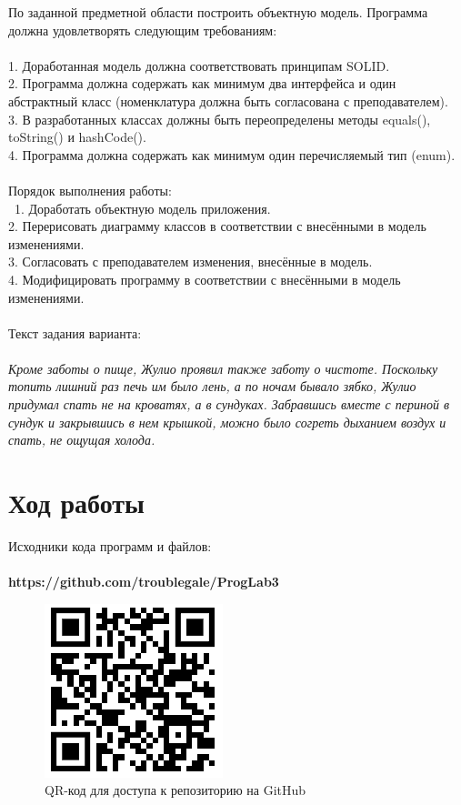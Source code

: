 \documentclass[12pt]{article}
\begin{document}
По заданной предметной области построить объектную модель. Программа должна удовлетворять следующим требованиям:\\
\\
1. Доработанная модель должна соответствовать принципам SOLID.\\
2. Программа должна содержать как минимум два интерфейса и один абстрактный класс (номенклатура должна быть согласована с преподавателем).\\
3. В разработанных классах должны быть переопределены методы equals(), toString() и hashCode().\\
4. Программа должна содержать как минимум один перечисляемый тип (enum).\\
\\
Порядок выполнения работы:\\
\
1. Доработать объектную модель приложения.\\
2. Перерисовать диаграмму классов в соответствии с внесёнными в модель изменениями.\\
3. Согласовать с преподавателем изменения, внесённые в модель.\\
4. Модифицировать программу в соответствии с внесёнными в модель изменениями.\\
\\
Текст задания варианта:\\
\\
\textit{Кроме заботы о пище, Жулио проявил также заботу о чистоте. Поскольку топить лишний раз печь им было лень, а по ночам бывало зябко, Жулио придумал спать не на кроватях, а в сундуках. Забравшись вместе с периной в сундук и закрывшись в нем крышкой, можно было согреть дыханием воздух и спать, не ощущая холода.}

\newpage

\section{Ход работы}

Исходники кода программ и файлов:\\
\\
\textbf{https://github.com/troublegale/ProgLab3}

\begin{figure}[h]
    \centering
    \includegraphics{image1.png}
    \caption{QR-код для доступа к репозиторию на GitHub}
\end{figure}
\end{document}
